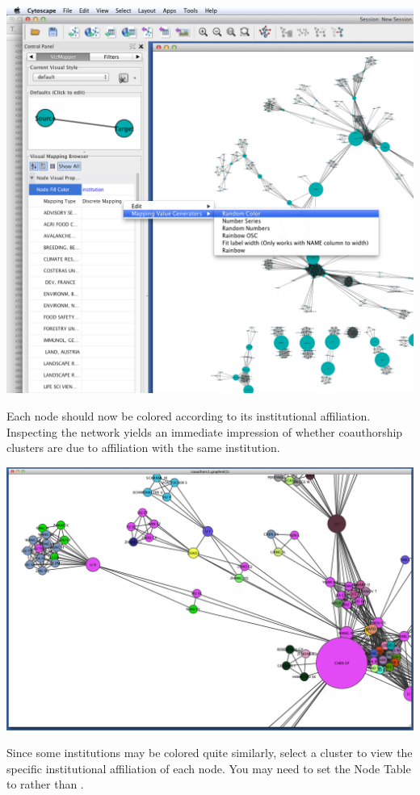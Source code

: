 \documentclass[letterpaper,10pt,english]{sphinxmanual}
\begin{document}
{\hfill\includegraphics{coauthors.17.png}\hfill}

Each node should now be colored according to its institutional affiliation.
Inspecting the network yields an immediate impression of whether coauthorship clusters are
due to affiliation with the same institution.

{\hfill\includegraphics{coauthors.18.png}\hfill}

Since some institutions may be colored quite similarly, select a cluster to view the
specific institutional affiliation of each node. You may need to set the Node Table to
 rather than .
\end{document}
